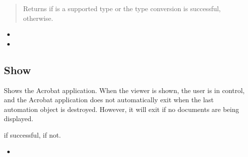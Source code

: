 \documentclass[letterpaper,12pt,english,openany,oneside]{sphinxmanual}
\begin{document}
\begin{quote}

Returns  if  is a supported type or the type conversion is successful,  otherwise.
\end{quote}
\label{\detokenize{IAC_API_OLE_Objects:related-methods-22}}
\begin{itemize}
\item {} 
 

\item {} 
 

\end{itemize}




\subsection{Show}
\label{\detokenize{IAC_API_OLE_Objects:show}}
Shows the Acrobat application. When the viewer is shown, the user is in control, and the Acrobat application does not automatically exit when the last automation object is destroyed. However, it will exit if no documents are being displayed.


\begin{sphinxVerbatim}[commandchars=\\\{\}]
 
\end{sphinxVerbatim}


 if successful,  if not.

\label{\detokenize{IAC_API_OLE_Objects:related-methods-23}}
\begin{itemize}
\item {} 
 

\end{itemize}
\end{document}
